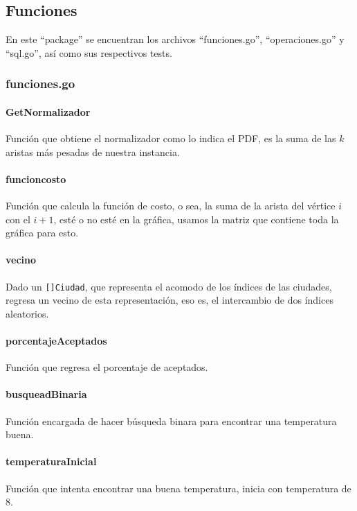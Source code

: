 \documentclass[
10pt,
a4paper,
oneside,
headinclude,footinclude,
BCOR5mm,
]{article}
\begin{document}
\subsection{Funciones}
En este ``package'' se encuentran los archivos ``funciones.go'',
``operaciones.go'' y ``sql.go'', así como sus respectivos tests.

\subsubsection{funciones.go}

\paragraph{GetNormalizador} Función que obtiene el normalizador como lo indica el
PDF, es la suma de las $k$ aristas más pesadas de nuestra instancia.

\paragraph{funcioncosto} Función que calcula la función de costo, o sea, la suma
de la arista del vértice $i$ con el $i+1$, esté o no esté en la gráfica, usamos
la matriz que contiene toda la gráfica para esto.

\paragraph{vecino} Dado un \texttt{[]Ciudad}, que representa el acomodo de los
índices de las ciudades, regresa un vecino de esta representación, eso es, el
intercambio de dos índices aleatorios.

\paragraph{porcentajeAceptados} Función que regresa el porcentaje de aceptados.

\paragraph{busqueadBinaria} Función encargada de hacer búsqueda binara para
encontrar una temperatura buena.

\paragraph{temperaturaInicial} Función que intenta encontrar una buena
temperatura, inicia con temperatura de 8.
\end{document}
